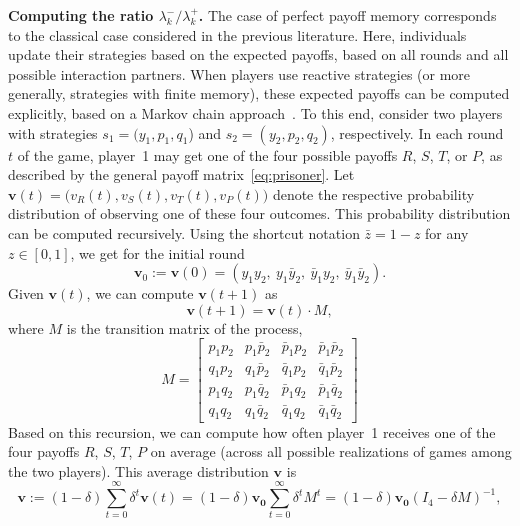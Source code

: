 \documentclass[11pt]{article}
\def\strategy{s}
\theoremstyle{plainCl1}
\theoremstyle{plainCl2}
\begin{document}
{\bf Computing the ratio $\lambda^-_k/\lambda^+_k$.}
The case of perfect payoff memory corresponds to the classical case considered in the previous literature. 
Here, individuals update their strategies based on the expected payoffs, based on all rounds and all possible interaction partners. 
When players use reactive strategies (or more generally, strategies with finite memory), these expected payoffs can be computed explicitly, based on a Markov chain approach~\cite{sigmund2010calculus}. 
To this end, consider two players with strategies $\strategy_1\!=\!(y_1, p_1, q_1$) and $\strategy_2\!=\!(y_2,p_2,q_2)$, respectively. 
In each round $t$ of the game, player~1 may get one of the four possible payoffs $R$, $S$, $T$, or $P$, as described by the general payoff matrix~\eqref{eq:prisoner}. 
Let $\mathbf{v}(t)\!=\!\big(v_R(t),v_S(t),v_T(t),v_P(t)\big)$ denote the respective probability distribution of observing one of these four outcomes.  
This probability distribution can be computed recursively. 
Using the shortcut notation $\bar{z}\!=\!1\!-\!z$ for any $z\!\in\![0,1]$, we get for the initial round 
\begin{equation} \label{Eq:v0}
\mathbf{v}_0:=\mathbf{v}(0) = (y_1 y_2,~y_1 \bar{y}_2,~\bar{y}_1 y_2,~\bar{y}_1 \bar{y}_2).
\end{equation}
Given $\mathbf{v}(t)$, we can compute $\mathbf{v}(t\!+\!1)$ as  
\begin{equation} \label{Eq:vt}
\mathbf{v}(t\!+\!1) = \mathbf{v}(t)\cdot M,
\end{equation}
where $M$ is the transition matrix of the process, 
\begin{equation} \label{eq:transition_matrix}
M=\left[
\begin{array}{llll}
p_1 p_2	&p_1 \bar{p}_2	&\bar{p}_1 p_2	&\bar{p}_1\bar{p}_2\\
q_1 p_2	&q_1 \bar{p}_2 &\bar{q}_1 p_2	&\bar{q}_1\bar{p}_2\\
p_1 q_2	&p_1 \bar{q}_2	&\bar{p}_1 q_2	&\bar{p}_1\bar{q}_2\\
q_1 q_2	&q_1 \bar{q}_2	&\bar{q}_1 q_2	&\bar{q}_1\bar{q}_2
\end{array}
\right]
\end{equation}
Based on this recursion, we can compute how often player~1 receives one of the four payoffs $R$, $S$, $T$, $P$ on average (across all possible realizations of games among the two players). This average distribution $\mathbf{v}$ is
\begin{equation} \label{Eq:vDefinition}
\mathbf{v} := (1\!-\!\delta) \sum_{t=0}^\infty \delta^t \mathbf{v}(t) 
= (1\!-\!\delta) \mathbf{v_0} \sum_{t=0}^\infty \delta^t M^t
= (1\!-\!\delta) \mathbf{v_0} (I_4-\delta M)^{-1},
\end{equation}
\end{document}
